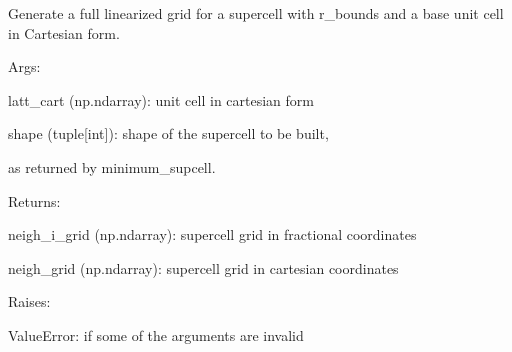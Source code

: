 \documentclass[letterpaper,10pt,english]{sphinxmanual}
\begin{document}
\begin{fulllineitems}
\label{doctree/soprano.utils:soprano.utils.supcell_gridgen}
Generate a full linearized grid for a supercell with r\_bounds
and a base unit cell in Cartesian form.

\begin{DUlineblock}{0em}
\item[] Args:
\item[]
\begin{DUlineblock}{\DUlineblockindent}
\item[] latt\_cart (np.ndarray): unit cell in cartesian form
\item[] shape (tuple{[}int{]}):  shape of the supercell to be built,
\item[]
\begin{DUlineblock}{\DUlineblockindent}
\item[] as returned by minimum\_supcell.
\end{DUlineblock}
\end{DUlineblock}
\end{DUlineblock}

\begin{DUlineblock}{0em}
\item[] Returns:
\item[]
\begin{DUlineblock}{\DUlineblockindent}
\item[] neigh\_i\_grid (np.ndarray): supercell grid in fractional coordinates
\item[] neigh\_grid (np.ndarray): supercell grid in cartesian coordinates
\end{DUlineblock}
\end{DUlineblock}

\begin{DUlineblock}{0em}
\item[] Raises:
\item[]
\begin{DUlineblock}{\DUlineblockindent}
\item[] ValueError: if some of the arguments are invalid
\end{DUlineblock}
\end{DUlineblock}

\end{fulllineitems}

\end{document}
